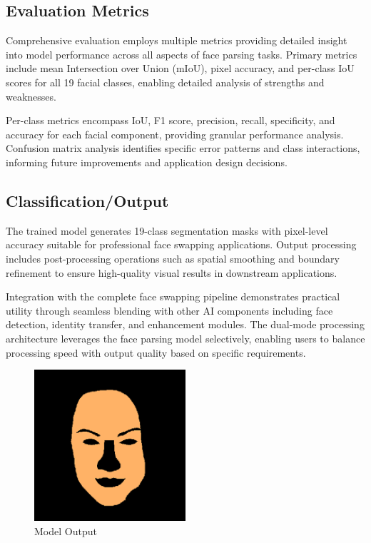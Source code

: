 \documentclass[12pt,a4paper]{report}
\begin{document}
\subsection{Evaluation Metrics}

Comprehensive evaluation employs multiple metrics providing detailed insight into model performance across all aspects of face parsing tasks. Primary metrics include mean Intersection over Union (mIoU), pixel accuracy, and per-class IoU scores for all 19 facial classes, enabling detailed analysis of strengths and weaknesses.

Per-class metrics encompass IoU, F1 score, precision, recall, specificity, and accuracy for each facial component, providing granular performance analysis. Confusion matrix analysis identifies specific error patterns and class interactions, informing future improvements and application design decisions.

\subsection{Classification/Output}

The trained model generates 19-class segmentation masks with pixel-level accuracy suitable for professional face swapping applications. Output processing includes post-processing operations such as spatial smoothing and boundary refinement to ensure high-quality visual results in downstream applications.

Integration with the complete face swapping pipeline demonstrates practical utility through seamless blending with other AI components including face detection, identity transfer, and enhancement modules. The dual-mode processing architecture leverages the face parsing model selectively, enabling users to balance processing speed with output quality based on specific requirements.
\begin{figure}[H]
\centering
\includegraphics[width=0.5\textwidth]{figures/output.png}
\caption{Model Output}
\label{fig:output}
\end{figure}
\end{document}
